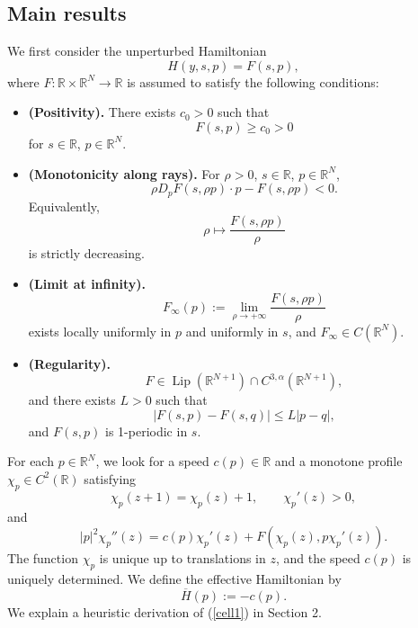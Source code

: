 \documentclass[preprint]{elsarticle}
\numberwithin{equation}{section}
\begin{document}
\subsection{Main results}


We first consider the unperturbed Hamiltonian
\begin{equation*}
H(y,s,p)=F(s,p),
\end{equation*}
where $F: \mathbb R \times \mathbb R^N \to \mathbb R$ is assumed to satisfy the following conditions:
\begin{itemize}
\item[(F1).]\textbf{(Positivity).}
There exists $c_0>0$ such that
\begin{equation}
F(s,p)\ge c_0>0
\end{equation}
for $s\in\mathbb R$, $p\in\mathbb R^N$.
\item[(F2).]\textbf{(Monotonicity along rays).}
For $\rho>0$, $s\in\mathbb R$, $p\in\mathbb R^N$,
\begin{equation}
\rho D_pF(s,\rho p)\cdot p-F(s,\rho p)<0.
\end{equation}
Equivalently,
$$
\rho\longmapsto \frac{F(s,\rho p)}{\rho}
$$
is strictly decreasing.
\item [(F3).]\textbf{(Limit at infinity).}\begin{equation}
F_\infty(p):=\lim_{\rho\to+\infty}\frac{F(s,\rho p)}{\rho}\label{recession}
\end{equation}
exists locally uniformly in $p$ and uniformly in $s$, and $F_\infty \in C(\mathbb R^N)$.
\item [(F4).]\textbf{(Regularity).}
\begin{equation}
F\in \operatorname{Lip}(\mathbb R^{N+1})\cap C^{3,\alpha}(\mathbb R^{N+1}),
\end{equation}
and there exists $L>0$ such that
\begin{equation}
|F(s,p)-F(s,q)|\le L|p-q|,
\end{equation}
and $F(s,p)$ is 1-periodic in $s$.
\end{itemize}

For each $p\in\mathbb R^N$, we look for a speed $c(p)\in\mathbb R$ and a monotone profile $\chi_p\in C^2(\mathbb R)$ satisfying
\begin{equation*}
\chi_p(z+1)=\chi_p(z)+1,
\qquad
\chi_p'(z)>0,
\end{equation*}
and
\begin{equation}
|p|^2\chi_p''(z)=c(p)\chi_p'(z)+F(\chi_p(z),p\chi_p'(z)).\label{cell1}
\end{equation}
The function $\chi_p$ is unique up to translations in $z$, and the speed $c(p)$ is uniquely determined. We define the effective Hamiltonian by
\begin{equation*}
\overline H(p):=-c(p).
\end{equation*}
We explain a heuristic derivation of (\ref{cell1}) in Section 2.
\end{document}
